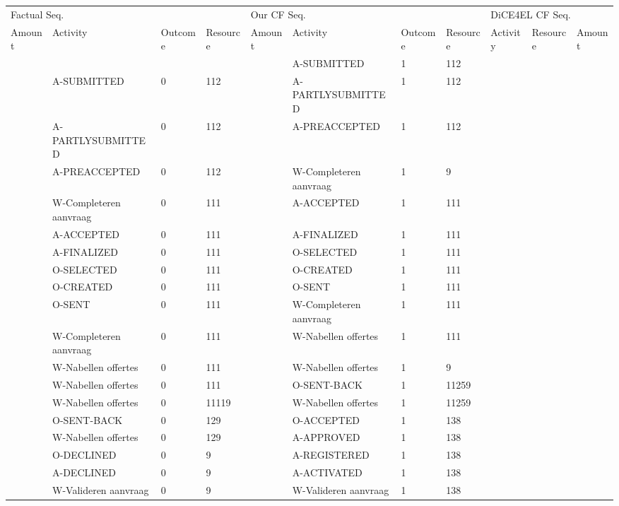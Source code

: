 \begin{tabular}{lllllllllll}
\toprule
\multicolumn{4}{l}{Factual Seq.} & \multicolumn{4}{l}{Our CF Seq.} & \multicolumn{3}{l}{DiCE4EL CF Seq.} \\
Amount & Activity & Outcome & Resource & Amount & Activity & Outcome & Resource & Activity & Resource & Amount \\
\midrule
 &  &  &  &  & A-SUBMITTED & 1 & 112 &  &  &  \\
 & A-SUBMITTED & 0 & 112 &  & A-PARTLYSUBMITTED & 1 & 112 &  &  &  \\
 & A-PARTLYSUBMITTED & 0 & 112 &  & A-PREACCEPTED & 1 & 112 &  &  &  \\
 & A-PREACCEPTED & 0 & 112 &  & W-Completeren aanvraag & 1 & 9 &  &  &  \\
 & W-Completeren aanvraag & 0 & 111 &  & A-ACCEPTED & 1 & 111 &  &  &  \\
 & A-ACCEPTED & 0 & 111 &  & A-FINALIZED & 1 & 111 &  &  &  \\
 & A-FINALIZED & 0 & 111 &  & O-SELECTED & 1 & 111 &  &  &  \\
 & O-SELECTED & 0 & 111 &  & O-CREATED & 1 & 111 &  &  &  \\
 & O-CREATED & 0 & 111 &  & O-SENT & 1 & 111 &  &  &  \\
 & O-SENT & 0 & 111 &  & W-Completeren aanvraag & 1 & 111 &  &  &  \\
 & W-Completeren aanvraag & 0 & 111 &  & W-Nabellen offertes & 1 & 111 &  &  &  \\
 & W-Nabellen offertes & 0 & 111 &  & W-Nabellen offertes & 1 & 9 &  &  &  \\
 & W-Nabellen offertes & 0 & 111 &  & O-SENT-BACK & 1 & 11259 &  &  &  \\
 & W-Nabellen offertes & 0 & 11119 &  & W-Nabellen offertes & 1 & 11259 &  &  &  \\
 & O-SENT-BACK & 0 & 129 &  & O-ACCEPTED & 1 & 138 &  &  &  \\
 & W-Nabellen offertes & 0 & 129 &  & A-APPROVED & 1 & 138 &  &  &  \\
 & O-DECLINED & 0 & 9 &  & A-REGISTERED & 1 & 138 &  &  &  \\
 & A-DECLINED & 0 & 9 &  & A-ACTIVATED & 1 & 138 &  &  &  \\
 & W-Valideren aanvraag & 0 & 9 &  & W-Valideren aanvraag & 1 & 138 &  &  &  \\
\bottomrule
\end{tabular}
